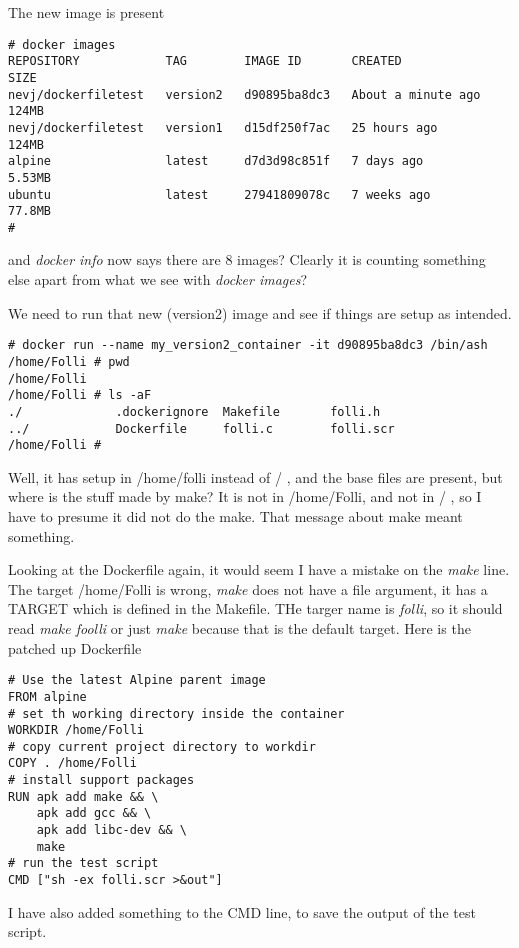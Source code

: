 \documentclass{article}  %
\begin{document}
The new image is present
\begin{verbatim}
# docker images
REPOSITORY            TAG        IMAGE ID       CREATED              SIZE
nevj/dockerfiletest   version2   d90895ba8dc3   About a minute ago   124MB
nevj/dockerfiletest   version1   d15df250f7ac   25 hours ago         124MB
alpine                latest     d7d3d98c851f   7 days ago           5.53MB
ubuntu                latest     27941809078c   7 weeks ago          77.8MB
# 
\end{verbatim}
 and {\em docker info} now says there are 8 images? Clearly it is counting something else apart from what we see with {\em docker images}?

We need to run that new (version2) image and see if things are setup as intended.
\begin{verbatim}
# docker run --name my_version2_container -it d90895ba8dc3 /bin/ash
/home/Folli # pwd
/home/Folli
/home/Folli # ls -aF
./             .dockerignore  Makefile       folli.h
../            Dockerfile     folli.c        folli.scr
/home/Folli # 
\end{verbatim}
 Well, it has setup in /home/folli instead of / , and the base files are present, but where is the stuff made by make? 
It is not in /home/Folli, and not in / , so I have to presume it did not do the make. That message about make meant something.

Looking at the Dockerfile again, it would seem I have a mistake on the {\em make} line. The target /home/Folli is wrong, {\em make} does not have a file argument, it has a TARGET which is defined in the Makefile. THe targer name is {\em folli}, so it should read {\em make foolli} or just {\em make} because that is the default target. Here is the patched up Dockerfile
\begin{verbatim}
# Use the latest Alpine parent image
FROM alpine
# set th working directory inside the container
WORKDIR /home/Folli
# copy current project directory to workdir
COPY . /home/Folli
# install support packages
RUN apk add make && \
    apk add gcc && \
    apk add libc-dev && \
    make 
# run the test script
CMD ["sh -ex folli.scr >&out"]
\end{verbatim}
 I have also added something to the CMD line, to save the output of the test script.
\end{document}
